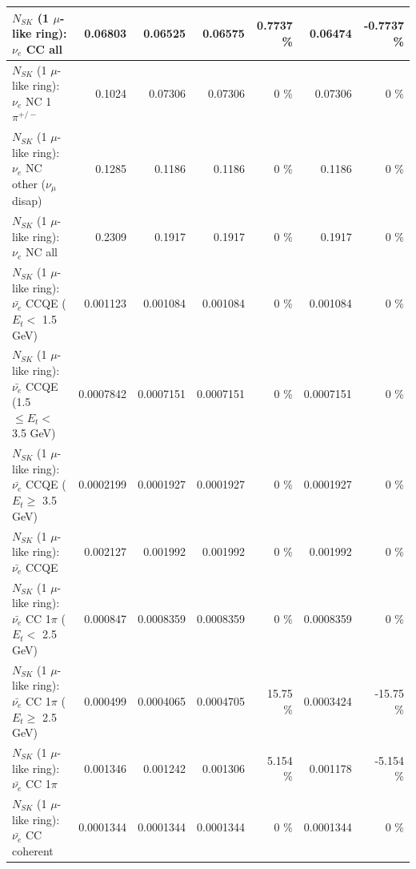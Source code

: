 \begin{table}
\begin{tabular}{| l | r | r | r  r | r  r |}
                                  $N_{SK}$ (1 $\mu$-like ring): $\nu_{e}$ CC all &         0.06803 &         0.06525 &         0.06575 &   0.7737 \%  &         0.06474 &  -0.7737 \%  \\ 
\hline
                           $N_{SK}$ (1 $\mu$-like ring): $\nu_e$ NC 1$\pi^{+/-}$ &          0.1024 &         0.07306 &         0.07306 &        0 \%  &         0.07306 &        0 \%  \\ 
                $N_{SK}$ (1 $\mu$-like ring): $\nu_e$ NC other ($\nu_\mu$ disap) &          0.1285 &          0.1186 &          0.1186 &        0 \%  &          0.1186 &        0 \%  \\ 
                                  $N_{SK}$ (1 $\mu$-like ring): $\nu_{e}$ NC all &          0.2309 &          0.1917 &          0.1917 &        0 \%  &          0.1917 &        0 \%  \\ 
\hline
\hline
\hline
            $N_{SK}$ (1 $\mu$-like ring): $\bar{\nu_e}$ CCQE ($E_{t} <$ 1.5 GeV) &        0.001123 &        0.001084 &        0.001084 &        0 \%  &        0.001084 &        0 \%  \\ 
   $N_{SK}$ (1 $\mu$-like ring): $\bar{\nu_e}$ CCQE (1.5 $\leq E_{t} <$ 3.5 GeV) &       0.0007842 &       0.0007151 &       0.0007151 &        0 \%  &       0.0007151 &        0 \%  \\ 
         $N_{SK}$ (1 $\mu$-like ring): $\bar{\nu_e}$ CCQE ($E_{t} \geq$ 3.5 GeV) &       0.0002199 &       0.0001927 &       0.0001927 &        0 \%  &       0.0001927 &        0 \%  \\ 
\hline
                                $N_{SK}$ (1 $\mu$-like ring): $\bar{\nu_e}$ CCQE &        0.002127 &        0.001992 &        0.001992 &        0 \%  &        0.001992 &        0 \%  \\ 
\hline
       $N_{SK}$ (1 $\mu$-like ring): $\bar{\nu_e}$ CC 1$\pi$ ($E_{t} <$ 2.5 GeV) &        0.000847 &       0.0008359 &       0.0008359 &        0 \%  &       0.0008359 &        0 \%  \\ 
    $N_{SK}$ (1 $\mu$-like ring): $\bar{\nu_e}$ CC 1$\pi$ ($E_{t} \geq$ 2.5 GeV) &        0.000499 &       0.0004065 &       0.0004705 &    15.75 \%  &       0.0003424 &   -15.75 \%  \\ 
\hline
                           $N_{SK}$ (1 $\mu$-like ring): $\bar{\nu_e}$ CC 1$\pi$ &        0.001346 &        0.001242 &        0.001306 &    5.154 \%  &        0.001178 &   -5.154 \%  \\ 
                         $N_{SK}$ (1 $\mu$-like ring): $\bar{\nu_e}$ CC coherent &       0.0001344 &       0.0001344 &       0.0001344 &        0 \%  &       0.0001344 &        0 \%  \\ 

\end{tabular}
\end{table}

